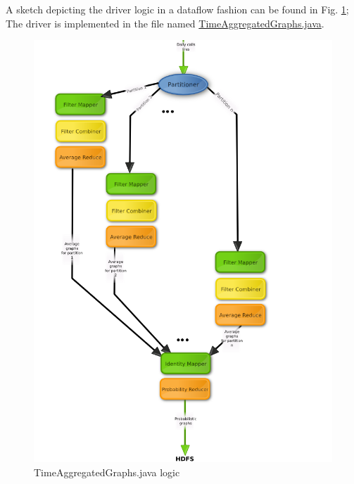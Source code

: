 A sketch depicting the driver logic in a dataflow fashion can be found in Fig. \ref{fig:aggregated};
The driver is implemented in the file named 
\href{https://github.com/michele-carignani/hadoop-markov-clustering/blob/master/src/aggregation/TimeAggregatedGraphs.java}{TimeAggregatedGraphs.java}.
\begin{figure}
	\centering
    \includegraphics[scale=0.7]{aggregation.png}
    \caption{TimeAggregatedGraphs.java logic}
    \label{fig:aggregated}
\end{figure}
\newpage
